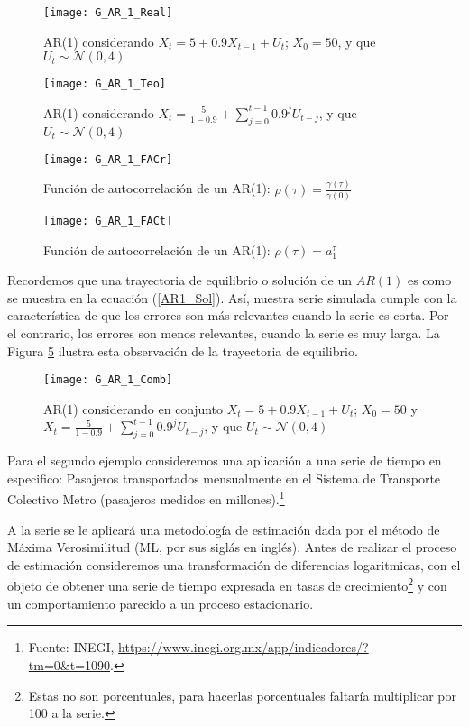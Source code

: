 \documentclass[
  a4paper,
]{article}
\begin{document}
\begin{figure}
  \centering
    \texttt{[image: G\_AR\_1\_Real]}
  \caption{AR(1) considerando $X_t = 5 + 0.9 X_{t-1} + U_t$; $X_0 = 50$, y que $U_t \sim \mathcal{N}(0, 4)$}
  \label{G_AR_1_Real}
\end{figure}

\begin{figure}
  \centering
    \texttt{[image: G\_AR\_1\_Teo]}
  \caption{AR(1) considerando $X_t = \frac{5}{1 - 0.9} + \sum_{j = 0}^{t-1} 0.9^j U_{t-j}$, y que $U_t \sim \mathcal{N}(0, 4)$}
  \label{G_AR_1_Teo}
\end{figure}

\begin{figure}
  \centering
    \texttt{[image: G\_AR\_1\_FACr]}
  \caption{Función de autocorrelación de un AR(1): $\rho(\tau) = \frac{\gamma(\tau)}{\gamma(0)}$}
  \label{G_AR_1_FACr}
\end{figure}

\begin{figure}
  \centering
    \texttt{[image: G\_AR\_1\_FACt]}
  \caption{Función de autocorrelación de un AR(1): $\rho(\tau) = a_1^\tau$}
  \label{G_AR_1_FACt}
\end{figure}

Recordemos que una trayectoria de equilibrio o solución de un \(AR(1)\)
es como se muestra en la ecuación (\ref{AR1_Sol}). Así, nuestra serie
simulada cumple con la característica de que los errores son más
relevantes cuando la serie es corta. Por el contrario, los errores son
menos relevantes, cuando la serie es muy larga. La Figura
\ref{G_AR_1_Comb} ilustra esta observación de la trayectoria de
equilibrio.

\begin{figure}
  \centering
    \texttt{[image: G\_AR\_1\_Comb]}
  \caption{AR(1) considerando en conjunto $X_t = 5 + 0.9 X_{t-1} + U_t$; $X_0 = 50$ y $X_t = \frac{5}{1 - 0.9} + \sum_{j = 0}^{t-1} 0.9^j U_{t-j}$, y que $U_t \sim \mathcal{N}(0, 4)$}
  \label{G_AR_1_Comb}
\end{figure}

Para el segundo ejemplo consideremos una aplicación a una serie de
tiempo en especifico: Pasajeros transportados mensualmente en el Sistema
de Transporte Colectivo Metro (pasajeros medidos en
millones).\footnote{Fuente: INEGI, \url{https://www.inegi.org.mx/app/indicadores/?tm=0&t=1090}.}

A la serie se le aplicará una metodología de estimación dada por el
método de Máxima Verosimilitud (ML, por sus siglás en inglés). Antes de
realizar el proceso de estimación consideremos una transformación de
diferencias logaritmicas, con el objeto de obtener una serie de tiempo
expresada en tasas de
crecimiento\footnote{Estas no son porcentuales, para hacerlas porcentuales faltaría multiplicar por 100 a la serie.}
y con un comportamiento parecido a un proceso estacionario.
\end{document}
